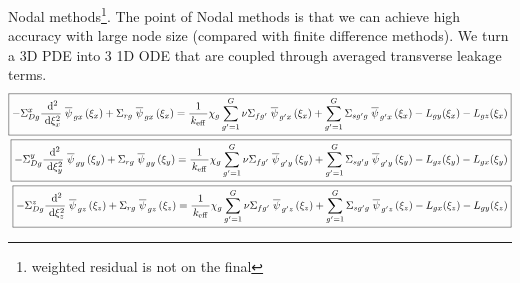 \documentclass{school-22.211-notes}
\begin{document}
\clearpage
{} 
Nodal methods\footnote{weighted residual is not on the final}. The point of Nodal methods is that we can achieve high accuracy with large node size (compared with finite difference methods). We turn a 3D PDE into 3 1D ODE that are coupled through averaged transverse leakage terms. 
    \begin{align*}
      \boxed{ - \Sigma_{Dg}^x \frac{\mbox{ }\mathrm{d}^2}{\mbox{ }\mathrm{d} \xi_x^2} \left.\overline{\psi} \right._{gx} (\xi_x) + \Sigma_{rg} \left.\overline{\psi} \right._{gx} (\xi_x) = \frac{1}{\left. k_{\mathrm{eff}} \right.} \chi_g \displaystyle\sum_{g'=1}^G \nu \Sigma_{fg'} \left.\overline{\psi} \right._{g'x} (\xi_x) + \displaystyle\sum_{g'=1}^G \Sigma_{sg'g} \left.\overline{\psi} \right._{g'x} (\xi_x) - L_{gy} (\xi_x) - L_{gz} (\xi_x) }    \\
   \boxed{ - \Sigma_{Dg}^y \frac{\mbox{ }\mathrm{d}^2}{\mbox{ }\mathrm{d} \xi_y^2} \left.\overline{\psi} \right._{gy} (\xi_y) + \Sigma_{rg} \left.\overline{\psi} \right._{gy} (\xi_y) = \frac{1}{\left. k_{\mathrm{eff}} \right.} \chi_g \displaystyle\sum_{g'=1}^G \nu \Sigma_{fg'} \left.\overline{\psi} \right._{g'y} (\xi_y) + \displaystyle\sum_{g'=1}^G \Sigma_{sg'g} \left.\overline{\psi} \right._{g'y} (\xi_y) - L_{gz} (\xi_y) - L_{gx} (\xi_y) }  \\
     \boxed{ - \Sigma_{Dg}^z \frac{\mbox{ }\mathrm{d}^2}{\mbox{ }\mathrm{d} \xi_z^2} \left.\overline{\psi} \right._{gz} (\xi_z) + \Sigma_{rg} \left.\overline{\psi} \right._{gz} (\xi_z) = \frac{1}{\left. k_{\mathrm{eff}} \right.} \chi_g \displaystyle\sum_{g'=1}^G \nu \Sigma_{fg'} \left.\overline{\psi} \right._{g'z} (\xi_z) + \displaystyle\sum_{g'=1}^G \Sigma_{sg'g} \left.\overline{\psi} \right._{g'z} (\xi_z) - L_{gx} (\xi_z) - L_{gy} (\xi_z) } 
    \end{align*}
\end{document}
